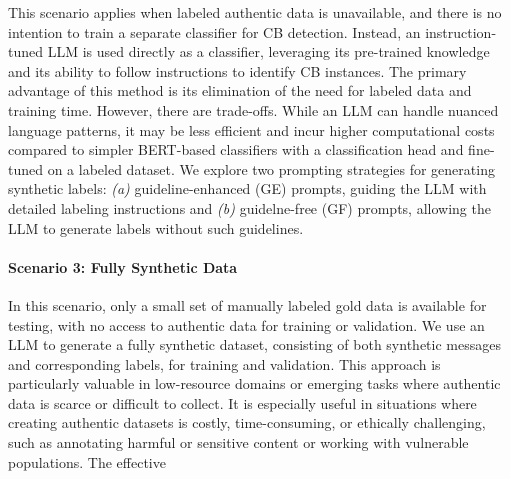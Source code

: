 This scenario applies when labeled authentic data is unavailable, and there is no intention to train a separate classifier for CB detection. Instead, an instruction-tuned
LLM is used directly as a classifier, leveraging its pre-trained knowledge and its ability to follow instructions
to identify CB instances.
The primary advantage of this method is its elimination of the need for labeled data and training time. However, there are trade-offs. While an LLM can handle nuanced language patterns, it may be less efficient and incur higher computational costs
compared to simpler BERT-based classifiers with a classification head and fine-
tuned on a labeled dataset.
We explore two prompting strategies for generating synthetic labels:
\textit{(a)} guideline-enhanced (GE) prompts, guiding the LLM with detailed labeling instructions and
\textit{(b)} guidelne-free (GF) prompts, allowing the LLM to generate labels without such guidelines.

\paragraph{Scenario 3: Fully Synthetic Data}

In this scenario, only a small set of manually labeled gold data is available for testing, with no access to authentic data for training or validation.
We
use an LLM to generate a fully synthetic dataset, consisting of both synthetic messages and corresponding labels, for training and validation.
This approach is particularly valuable in low-resource domains or emerging tasks where authentic data is scarce or difficult to collect.
It is especially useful in situations where creating authentic datasets is costly, time-consuming, or ethically challenging, such as annotating harmful or sensitive content or working with vulnerable populations.
The effective



